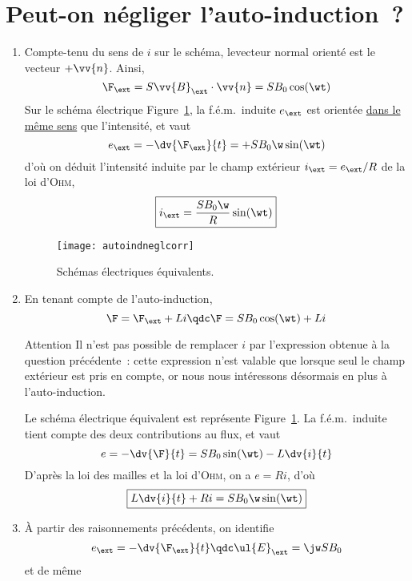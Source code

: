 \documentclass[a4paper, 10pt, final, garamond]{book}
\begin{document}
\section{Peut-on négliger l'auto-induction~?}
\label{sec:neglautoindcorr}
\begin{enumerate}
	\item Compte-tenu du sens de $i$ sur le schéma, levecteur normal orienté est
	      le vecteur $+\vv{n}$. Ainsi,
	      \[
		      \F_{\ext} = S \vv{B}_{\ext}\cdot \vv{n} = S B_0 \cos(\wt)
	      \]
	      Sur le schéma électrique Figure~\ref{fig:neglautoindcorr}, la f.é.m.\
	      induite $e_{\ext}$ est orientée \ul{dans le même sens} que l'intensité,
	      et vaut
	      \[
		      e_{\ext} = -\dv{\F_{\ext}}{t} = + SB_0\w \sin(\wt)
	      \]
	      d'où on déduit l'intensité induite par le champ extérieur $i_{\ext} =
		      e_{\ext}/R$ de la loi d'\textsc{Ohm},
	      \[
		      \boxed{i_{\ext} = \frac{SB_0\w}{R}\sin(\wt)}
	      \]
	      \begin{figure}[htbp]
		      \centering
		      \texttt{[image: autoindneglcorr]}
		      \caption{Schémas électriques équivalents.}
		      \label{fig:neglautoindcorr}
	      \end{figure}
	\item En tenant compte de l'auto-induction,
	      \[
		      \F = \F_{\ext} + Li
		      \qdc
		      \F = SB_0 \cos(\wt) + Li
	      \]
	      \begin{tror}{Attention}
		      Il n'est pas possible de remplacer $i$ par l'expression obtenue à la
		      question précédente~: cette expression n'est valable que lorsque seul
		      le champ extérieur est pris en compte, or nous nous intéressons
		      désormais en plus à l'auto-induction.
	      \end{tror}
	      Le schéma électrique équivalent est représente
	      Figure~\ref{fig:neglautoindcorr}. La f.é.m.\ induite tient compte des
	      deux contributions au flux, et vaut
	      \[
		      e = -\dv{\F}{t} = SB_0 \sin(\wt) - L \dv{i}{t}
	      \]
	      D'après la loi des mailles et la loi d'\textsc{Ohm}, on a $e = Ri$, d'où
	      \begin{equation}
		      \label{eq:autoindnegl1}
		      \boxed{L \dv{i}{t} + Ri = SB_0\w \sin(\wt)}
	      \end{equation}
	\item À partir des raisonnements précédents, on identifie
	      \[
		      e_{\ext} = - \dv{\F_{\ext}}{t}
		      \qdc
		      \ul{E}_{\ext} = \jw SB_0
	      \]
	      et de même

\end{enumerate}
\end{document}
